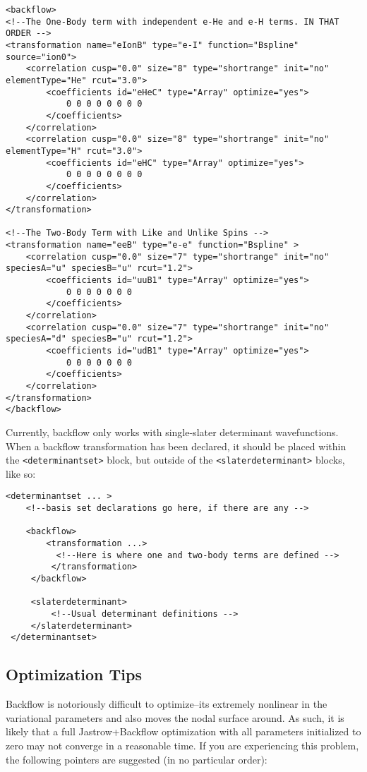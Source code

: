 \begin{lstlisting}
<backflow>
<!--The One-Body term with independent e-He and e-H terms. IN THAT ORDER -->
<transformation name="eIonB" type="e-I" function="Bspline" source="ion0">
    <correlation cusp="0.0" size="8" type="shortrange" init="no" elementType="He" rcut="3.0">
        <coefficients id="eHeC" type="Array" optimize="yes"> 
            0 0 0 0 0 0 0 0
        </coefficients>
    </correlation>
    <correlation cusp="0.0" size="8" type="shortrange" init="no" elementType="H" rcut="3.0">
        <coefficients id="eHC" type="Array" optimize="yes"> 
            0 0 0 0 0 0 0 0
        </coefficients>
    </correlation>
</transformation>

<!--The Two-Body Term with Like and Unlike Spins -->
<transformation name="eeB" type="e-e" function="Bspline" >
    <correlation cusp="0.0" size="7" type="shortrange" init="no" speciesA="u" speciesB="u" rcut="1.2">
        <coefficients id="uuB1" type="Array" optimize="yes"> 
            0 0 0 0 0 0 0
        </coefficients>
    </correlation>
    <correlation cusp="0.0" size="7" type="shortrange" init="no" speciesA="d" speciesB="u" rcut="1.2">
        <coefficients id="udB1" type="Array" optimize="yes"> 
            0 0 0 0 0 0 0
        </coefficients>
    </correlation>
</transformation>
</backflow>
\end{lstlisting}  

Currently, backflow only works with single-slater determinant wavefunctions.  When a backflow transformation has been declared, it should be placed within the \texttt{<determinantset>} block, but outside of the \texttt{<slaterdeterminant>} blocks, like so:

\begin{lstlisting}
<determinantset ... >
    <!--basis set declarations go here, if there are any -->
    
    <backflow>
        <transformation ...>
          <!--Here is where one and two-body terms are defined -->
         </transformation>
     </backflow>
     
     <slaterdeterminant>
         <!--Usual determinant definitions -->
     </slaterdeterminant>
 </determinantset>
\end{lstlisting}

\subsection{Optimization Tips}
Backflow is notoriously difficult to optimize--its extremely nonlinear in the variational parameters and also moves the nodal surface around.  As such, it is likely that a full Jastrow+Backflow optimization with all parameters initialized to zero may not converge in a reasonable time.  If you are experiencing this problem, the following pointers are suggested (in no particular order):

